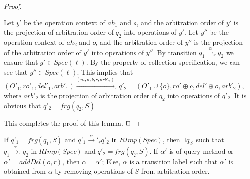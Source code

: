 \begin {proof}
\begin{itemize}
    Let $y'$ be the operation context of $\mathit{ah}_1$ and $o$, and the arbitration order of $y'$ is the projection of arbitration order of $q_2$ into operations of $y'$. Let $y''$ be the operation context of $\mathit{ah}_2$ and $o$, and the arbitration order of $y''$ is the projection of the arbitration order of $y'$ into operations of $y''$. By transition $q_1 {\xrightarrow{\alpha}}_r q_2$ we ensure that $y' \in \mathit{Spec}(\ell)$. By the property of collection specification, we can see that $y'' \in \mathit{Spec}(\ell)$. This implies that $(O'_1,\mathit{ro}'_1,\mathit{del}'_1,\mathit{arb}'_1) {\xrightarrow{(m,a,b,r,\mathit{arb}'_2)}}_r q'_2 =  (O'_1 \cup \{ o \},\mathit{ro}' \oplus o ,\mathit{del}' \oplus o,\mathit{arb}'_2)$, where $\mathit{arb}'_2$ is the projection of arbitration order of $q_2$ into operations of $q'_2$. It is obvious that $q'_2 = \mathit{frg}(q_2,S)$.
\end{itemize}
This completes the proof of this lemma. $\qed$
\end {proof}



\begin{lemma}
\label{lemma:SRImpSpec is simulated by RimpSpec}
If $q'_1 = \mathit{frg}(q_1,S)$ and $q'_1 {\xrightarrow{\alpha}'}_r q'_2$ in $\mathit{RImp}(\mathit{Spec})$, then $\exists q_2$, such that $q_1 {\xrightarrow{\alpha}}_r q_2$ in $\mathit{RImp}(\mathit{Spec})$ and $q'_2 = \mathit{frg}(q_2,S)$. If $\alpha'$ is of query method or $\alpha' = \mathit{addDel}(o,r)$, then $\alpha = \alpha'$; Else, $\alpha$ is a transition label such that $\alpha'$ is obtained from $\alpha$ by removing operations of $S$ from arbitration order.
\end{lemma}


